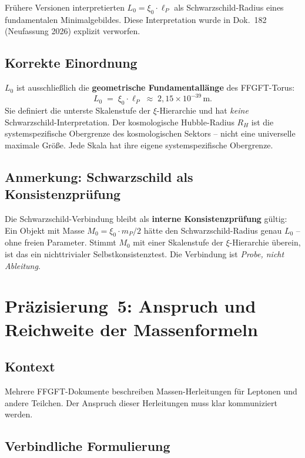 Frühere Versionen interpretierten $L_0 = \xi_0 \cdot \ell_P$ als
Schwarzschild-Radius eines fundamentalen Minimalgebildes. Diese
Interpretation wurde in Dok.~182 (Neufassung 2026) explizit verworfen.

\subsection*{Korrekte Einordnung}

$L_0$ ist ausschließlich die \textbf{geometrische Fundamentallänge} des
FFGFT-Torus:
\begin{equation}
  L_0 \;=\; \xi_0 \cdot \ell_P \;\approx\; 2{,}15 \times 10^{-39}\,\text{m}.
  \tag{190.10}
\end{equation}
Sie definiert die unterste Skalenstufe der $\xi$-Hierarchie und hat
\emph{keine} Schwarzschild-Interpretation. Der kosmologische Hubble-Radius
$R_H$ ist die systemspezifische Obergrenze des kosmologischen Sektors --
nicht eine universelle maximale Größe. Jede Skala hat ihre eigene
systemspezifische Obergrenze.

\subsection*{Anmerkung: Schwarzschild als Konsistenzprüfung}

Die Schwarzschild-Verbindung bleibt als \textbf{interne Konsistenzprüfung} gültig:
Ein Objekt mit Masse $M_0 = \xi_0 \cdot m_P / 2$ hätte den Schwarzschild-Radius
genau $L_0$ -- ohne freien Parameter. Stimmt $M_0$ mit einer Skalenstufe der
$\xi$-Hierarchie überein, ist das ein nichttrivialer Selbstkonsistenztest.
Die Verbindung ist \emph{Probe, nicht Ableitung}.

\section{Präzisierung~5: Anspruch und Reichweite der Massenformeln}

\subsection*{Kontext}

Mehrere FFGFT-Dokumente beschreiben Massen-Herleitungen für Leptonen
und andere Teilchen. Der Anspruch dieser Herleitungen muss klar
kommuniziert werden.

\subsection*{Verbindliche Formulierung}

